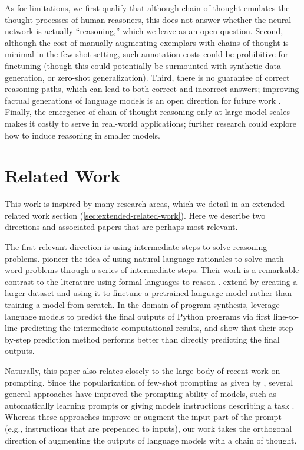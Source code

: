 \documentclass[]{article}
\theoremstyle{plain}
\theoremstyle{definition}
\theoremstyle{remark}
\newcommand{\orange}[1]{#1}
\begin{document}
As for limitations, we first qualify that although chain of thought emulates the thought processes of human reasoners, this does not answer whether the neural network is actually ``reasoning,'' which we leave as an open question.
Second, although the cost of manually augmenting exemplars with chains of thought is minimal in the few-shot setting, such annotation costs could be prohibitive for finetuning (though this could potentially be surmounted with synthetic data generation, or zero-shot generalization).
\orange{Third, there is no guarantee of correct reasoning paths, which can lead to both correct and incorrect answers; improving factual generations of language models is an open direction for future work \citep[][\textit{inter alia}]{rashkin2021measuring,ye2022unreliability,wiegreffe2021reframing}.}
Finally, the emergence of chain-of-thought reasoning only at large model scales makes it costly to serve in real-world applications; further research could explore how to induce reasoning in smaller models.

\section{Related Work}
This work is inspired by many research areas, which we detail in an extended related work section (\cref{sec:extended-related-work}). Here we describe two directions and associated papers that are perhaps most relevant.

The first relevant direction is using intermediate steps to solve reasoning problems. \cite{ling-etal-2017-program} pioneer the idea of using natural language rationales to solve math word problems through a series of intermediate steps. Their work is a remarkable contrast to the literature using formal languages to reason \citep{roy-2016-reasoning, chiang-chen-2019-semantically, amini-etal-2019-mathqa, chen2019neural}.  \citet{cobbe2021training} extend \citet{ling-etal-2017-program} by creating a larger dataset and using it to finetune a pretrained language model rather than training a model from scratch. In the domain of program synthesis, \cite{nye2021show} leverage language models to predict the final outputs of Python programs via first line-to-line predicting the intermediate computational results, and show that their step-by-step prediction method performs better than directly predicting the final outputs.  

Naturally, this paper also relates closely to the large body of recent work on prompting.
Since the popularization of few-shot prompting as given by \citet{brown2020language}, several general approaches have improved the prompting ability of models, such as automatically learning prompts \citep{lester-etal-2021-power} or giving models instructions describing a task \citep{wei2021finetuned,sanh2021multitask,ouyang2022training}.
Whereas these approaches improve or augment the input part of the prompt (e.g., instructions that are prepended to inputs), our work takes the orthogonal direction of augmenting the outputs of language models with a chain of thought.
\end{document}
